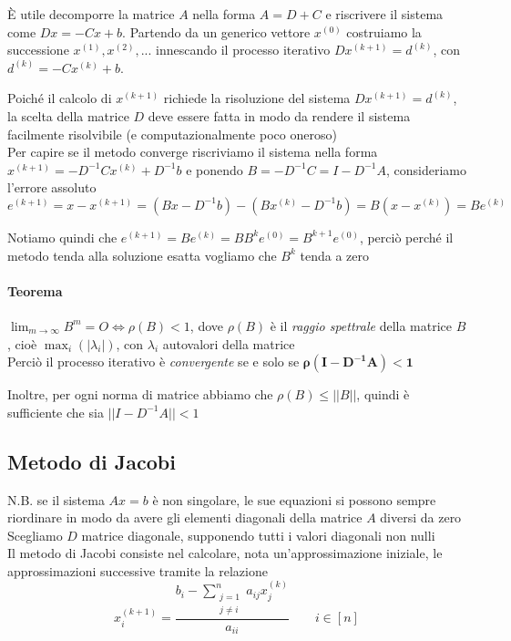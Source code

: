 \documentclass[openany]{book}
\begin{document}
È utile decomporre la matrice $A$ nella forma $A=D+C$ e riscrivere il sistema come $Dx=-Cx+b$. Partendo da un generico vettore $x^{(0)}$ costruiamo la successione $x^{(1)},x^{(2)},...$ innescando il processo iterativo $Dx^{(k+1)}=d^{(k)}$, con $d^{(k)}= -Cx^{(k)}+b$.

Poiché il calcolo di $x^{(k+1)}$ richiede la risoluzione del sistema $Dx^{(k+1)}=d^{(k)}$, la scelta della matrice $D$ deve essere fatta in modo da rendere il sistema facilmente risolvibile (e computazionalmente poco oneroso)
\\

Per capire se il metodo converge riscriviamo il sistema nella forma $x^{(k+1)}=-D^{-1}Cx^{(k)}+D^{-1}b$ e ponendo $B=-D^{-1}C=I-D^{-1}A$, consideriamo l'errore assoluto $e^{(k+1)}=x-x^{(k+1)}=(Bx-D^{-1}b)-(Bx^{(k)}-D^{-1}b)=B(x-x^{(k)})=Be^{(k)}$

Notiamo quindi che $e^{(k+1)}= Be^{(k)}=BB^{k}e^{(0)}=B^{k+1}e^{(0)}$, perciò perché il metodo tenda alla soluzione esatta vogliamo che $B^k$ tenda a zero

\paragraph{Teorema}

$\lim_{m\to\infty}B^m=O \Leftrightarrow \rho(B)<1$, dove $\rho(B)$ è il \textit{raggio spettrale} della matrice $B$, cioè $\max_i (|\lambda_i|)$, con $\lambda_i$ autovalori della matrice
\\

Perciò il processo iterativo è \textit{convergente} se e solo se $\boldsymbol{\rho(I-D^{-1}A)<1}$

Inoltre, per ogni norma di matrice abbiamo che $\rho(B)\leq||B||$, quindi è sufficiente che sia $||I-D^{-1}A||<1$
\subsection{Metodo di Jacobi}

N.B. se il sistema $Ax=b$ è non singolare, le sue equazioni si possono sempre riordinare in modo da avere gli elementi diagonali della matrice $A$ diversi da zero
\\

Scegliamo $D$ matrice diagonale, supponendo tutti i valori diagonali non nulli
\\

Il metodo di Jacobi consiste nel calcolare, nota un'approssimazione iniziale, le approssimazioni successive tramite la relazione
\[ \displaystyle x_i^{(k+1)}=\frac{b_i-\displaystyle\sum^n_{\substack{j=1 \\ j\neq i}}a_{ij}x_j^{(k)}}{a_{ii}} \qquad i\in[n] \]
\end{document}
